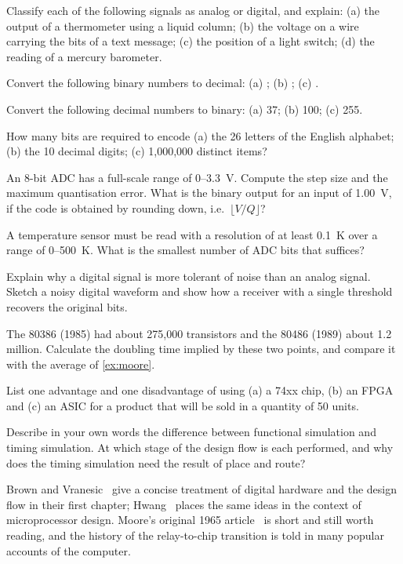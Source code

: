 \begin{exlist}
  \item Classify each of the following signals as analog or digital, and explain: (a) the output of a thermometer using a liquid column; (b) the voltage on a wire carrying the bits of a text message; (c) the position of a light switch; (d) the reading of a mercury barometer.
  \item Convert the following binary numbers to decimal: (a) ; (b) ; (c) .
  \item Convert the following decimal numbers to binary: (a) 37; (b) 100; (c) 255.
  \item How many bits are required to encode (a) the 26 letters of the English alphabet; (b) the 10 decimal digits; (c) 1{,}000{,}000 distinct items?
  \item An 8-bit ADC has a full-scale range of 0--3.3~V. Compute the step size and the maximum quantisation error. What is the binary output for an input of 1.00~V, if the code is obtained by rounding down, i.e.\ $\lfloor V/Q\rfloor$?
  \item A temperature sensor must be read with a resolution of at least 0.1~K over a range of 0--500~K. What is the smallest number of ADC bits that suffices?
  \item Explain why a digital signal is more tolerant of noise than an analog signal. Sketch a noisy digital waveform and show how a receiver with a single threshold recovers the original bits.
  \item The 80386 (1985) had about 275{,}000 transistors and the 80486 (1989) about 1.2 million. Calculate the doubling time implied by these two points, and compare it with the average of \cref{ex:moore}.
  \item List one advantage and one disadvantage of using (a) a 74xx chip, (b) an FPGA and (c) an ASIC for a product that will be sold in a quantity of 50 units.
  \item Describe in your own words the difference between functional simulation and timing simulation. At which stage of the design flow is each performed, and why does the timing simulation need the result of place and route?
\end{exlist}

Brown and Vranesic~\cite{brown2009} give a concise treatment of digital hardware and the design flow in their first chapter; Hwang~\cite{hwang2018} places the same ideas in the context of microprocessor design. Moore's original 1965 article~\cite{moore1965} is short and still worth reading, and the history of the relay-to-chip transition is told in many popular accounts of the computer.
